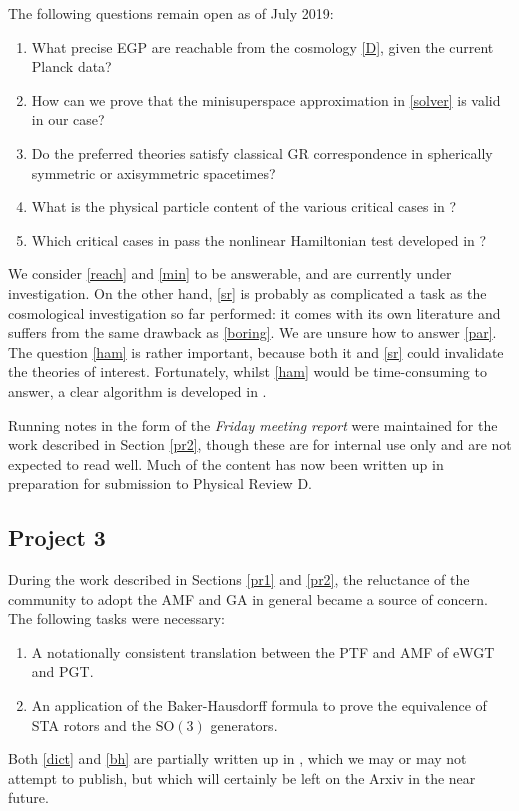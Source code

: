 \documentclass[twoside]{report}
\begin{document}
\begin{multicols}{2}
The following questions remain open as of July 2019:
\begin{enumerate}[resume]
  \item\label{reach} What precise EGP are reachable from the cosmology \ref{D}, given the current Planck data?
  \item\label{min} How can we prove that the minisuperspace approximation in \ref{solver} is valid in our case?
  \item\label{sr} Do the preferred theories satisfy classical GR correspondence in spherically symmetric or axisymmetric spacetimes?
  \item\label{par} What is the physical particle content of the various critical cases in \cite{2019PhRvD..99f4001L,Lin2}?
  \item\label{ham} Which critical cases in \cite{2019PhRvD..99f4001L,Lin2} pass the nonlinear Hamiltonian test developed in \cite{1999IJMPD...8..459Y,2002IJMPD..11..747Y}?
\end{enumerate}
We consider \ref{reach} and \ref{min} to be answerable, and are currently under investigation. On the other hand, \ref{sr} is probably as complicated a task as the cosmological investigation so far performed: it comes with its own literature and suffers from the same drawback as \ref{boring}. We are unsure how to answer \ref{par}. The question \ref{ham} is rather important, because both it and \ref{sr} could invalidate the theories of interest. Fortunately, whilst \ref{ham} would be time-consuming to answer, a clear algorithm is developed in \cite{1999IJMPD...8..459Y,2002IJMPD..11..747Y}.

Running notes in the form of the \textit{Friday meeting report} \cite{fmr} were maintained for the work described in Section \ref{pr2}, though these are for internal use only and are not expected to read well. Much of the content has now been written up \cite{paper-2} in preparation for submission to Physical Review D.
\subsection{Project 3}\label{pr3}
During the work described in Sections \ref{pr1} and \ref{pr2}, the reluctance of the community to adopt the AMF and GA in general became a source of concern. The following tasks were necessary:
\begin{enumerate}[resume]
  \item\label{dict} A notationally consistent translation between the PTF and AMF of eWGT and PGT.
  \item\label{bh} An application of the Baker-Hausdorff formula to prove the equivalence of STA rotors and the $\mathrm{SO}(3)$ generators.
\end{enumerate}
Both \ref{dict} and \ref{bh} are partially written up in \cite{dictionary}, which we may or may not attempt to publish, but which will certainly be left on the Arxiv in the near future.

\end{multicols}
\end{document}
